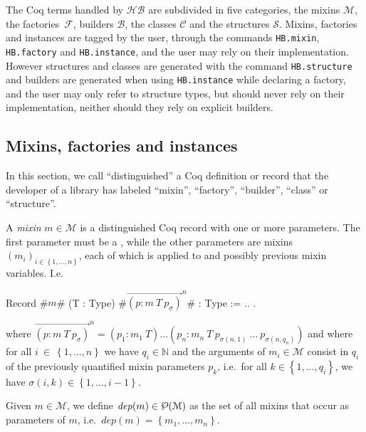 \documentclass[a4paper,UKenglish,cleveref, autoref]{lipics-v2019}
\newcommand{\HB}{\ensuremath{\mathcal{HB}}}
\newcommand{\mixin}{mixin}
\newcommand{\mixins}{mixins}
\newcommand{\Mixins}{Mixins}
\newcommand{\M}{\ensuremath{\mathcal{M}}}
\newcommand{\factory}{factory}
\newcommand{\factories}{factories}
\newcommand{\mixinbuilder}{builder}
\newcommand{\mixinbuilders}{builders}
\newcommand{\F}{\ensuremath{\mathcal{F}}}
\newcommand{\dep}{\ensuremath{\mathit{dep}}}
\newcommand{\powerset}[1]{\raisebox{.15\baselineskip}{\Large\ensuremath{\wp}}(#1)}
\newcommand{\C}{\ensuremath{\mathcal{C}}}
\newcommand{\B}{\ensuremath{\mathcal{B}}}
\newcommand{\class}{class}
\newcommand{\classes}{classes}
\newcommand{\Str}{\ensuremath{\mathcal{S}}}
\newcommand{\structure}{structure}
\newcommand{\structures}{structures}
\newcommand{\set}[1]{\left\{#1\right\}}
\newcommand{\enum}[2]{\ensuremath{\set{#1,\ldots,#2}}}
\newcommand{\vect}[1]{\overrightarrow{#1}}
\newcommand{\pmp}[1]{\ensuremath{\vect{\left(p : m\ T\ p_\sigma\right)}^{#1}}}
\newcommand{\hbmixin}{{\tt\color{dkgreen}HB.mixin}}
\newcommand{\hbfactory}{{\tt\color{dkgreen}HB.factory}}
\newcommand{\hbinstance}{{\tt\color{dkgreen}HB.instance}}
\newcommand{\hbstructure}{{\tt\color{dkgreen}HB.structure}}
\theoremstyle{implem}
\theoremstyle{implem}
\theoremstyle{command}
\theoremstyle{commands}
\begin{document}
The Coq terms handled by \HB{} are subdivided in five categories, the
\mixins{} \(\M{}\), the \factories{}~\(\F{}\), \mixinbuilders{}
\(\B{}\), the \classes{} \(\C{}\) and the \structures{}
\(\Str{}\). \Mixins{}, \factories{} and instances are tagged by the
user, through the commands \hbmixin{}, \hbfactory{} and \hbinstance{},
and the user may rely on their implementation. However structures and
classes are generated with the command \hbstructure{} and builders are
generated when using \hbinstance{} while declaring a \factory{}, and
the user may only refer to structure types, but should never rely on
their implementation, neither should they rely on explicit builders.

\subsection{\Mixins{}, \factories{} and instances}
\label{sec:hb-mixins-factories}

In this section, we call ``distinguished'' a Coq definition or record
that the developer of a library has labeled ``\mixin{}'', ``\factory{}'',
``\mixinbuilder{}'', ``\class{}'' or ``\structure{}''.

\begin{definition}[\M{}, \mixins{}]
  A \emph{\mixin{}} \(m \in \M{}\) is a distinguished Coq record with one or more
  parameters.  The first parameter must be a , while
  the other parameters are \mixins{} \(\left(m_i\right)_{i \in \enum1n}\), each of which
  is applied to  and possibly previous mixin variables. I.e.
\begin{coqcode}
Record #$m$# (T : Type) #\(\pmp{n}\)# : Type := { .. }.
\end{coqcode}
where \(\pmp{n} = (p_1 : m_1\ T) \ldots \left(p_n : m_n\ T\ p_{\sigma(n,1)}\ \ldots\ p_{\sigma(n,q_n)}\right)\)
and where for all \(i~\in~\enum1n\) we have \(q_i \in \mathbb{N}\) and the
arguments of \(m_i \in \M{}\) consist in $q_i$ of the previously quantified
mixin parameters $p_k$, i.e.~for all \(k \in \enum1{q_i}\), we
have \(\sigma(i,k) \in \enum1{i-1}\).
\end{definition}

\begin{definition}[\dep{}, \mixin{} dependencies]
  Given \(m \in \M{}\), we define \(\dep{}(m) \in \powerset\M{}\)
  as the set of all \mixins{} that occur as parameters of \(m\),
  i.e.~\(\dep{}(m) = \enum{m_1}{m_n}\).
\end{definition}
\end{document}
